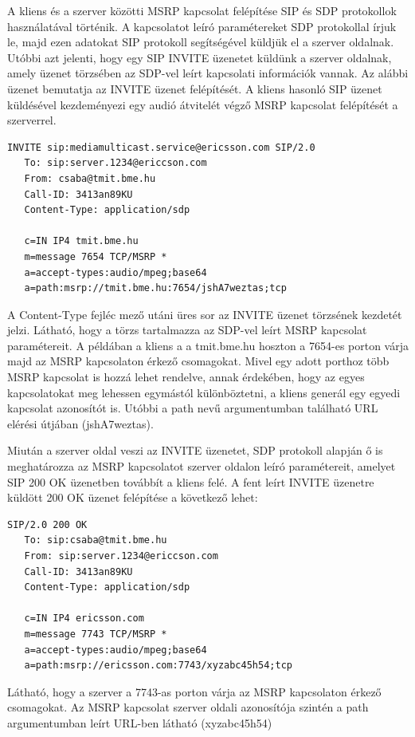A kliens és a szerver közötti MSRP kapcsolat felépítése SIP és SDP protokollok használatával történik. A kapcsolatot leíró paramétereket SDP protokollal írjuk le, majd ezen adatokat SIP protokoll segítségével küldjük el a szerver oldalnak. Utóbbi azt jelenti, hogy egy SIP INVITE üzenetet küldünk a szerver oldalnak, amely üzenet törzsében az SDP-vel leírt kapcsolati információk vannak. Az alábbi üzenet bemutatja az INVITE üzenet felépítését. A kliens hasonló SIP üzenet küldésével kezdeményezi egy audió átvitelét végző MSRP kapcsolat felépítését a szerverrel.

\fontsize{10}{10}
\begin{verbatim}
INVITE sip:mediamulticast.service@ericsson.com SIP/2.0
   To: sip:server.1234@ericcson.com
   From: csaba@tmit.bme.hu
   Call-ID: 3413an89KU
   Content-Type: application/sdp

   c=IN IP4 tmit.bme.hu
   m=message 7654 TCP/MSRP *
   a=accept-types:audio/mpeg;base64
   a=path:msrp://tmit.bme.hu:7654/jshA7weztas;tcp
\end{verbatim}
\fontsize{12}{12} 

A Content-Type fejléc mező utáni üres sor az INVITE üzenet törzsének kezdetét jelzi. Látható, hogy a  törzs tartalmazza az SDP-vel leírt MSRP kapcsolat paramétereit. A példában a kliens a a tmit.bme.hu hoszton a 7654-es porton várja majd az MSRP kapcsolaton érkező csomagokat. Mivel egy adott porthoz több MSRP kapcsolat is hozzá lehet rendelve, annak érdekében, hogy az egyes kapcsolatokat meg lehessen egymástól különböztetni, a kliens generál egy egyedi kapcsolat azonosítót is. Utóbbi a path nevű argumentumban található URL elérési útjában (jshA7weztas). 

Miután a szerver oldal veszi az INVITE üzenetet, SDP protokoll alapján ő is meghatározza az MSRP kapcsolatot szerver oldalon leíró paramétereit, amelyet SIP 200 OK üzenetben továbbít a kliens felé. A fent leírt INVITE üzenetre küldött 200 OK üzenet felépítése a következő lehet:

\fontsize{10}{10}
\begin{verbatim}
SIP/2.0 200 OK
   To: sip:csaba@tmit.bme.hu
   From: sip:server.1234@ericcson.com
   Call-ID: 3413an89KU
   Content-Type: application/sdp

   c=IN IP4 ericsson.com
   m=message 7743 TCP/MSRP *
   a=accept-types:audio/mpeg;base64
   a=path:msrp://ericsson.com:7743/xyzabc45h54;tcp
\end{verbatim}
\fontsize{12}{12} 
 
Látható, hogy a szerver a 7743-as porton várja az MSRP kapcsolaton érkező csomagokat. Az MSRP kapcsolat szerver oldali azonosítója szintén a path argumentumban leírt URL-ben látható (xyzabc45h54)

